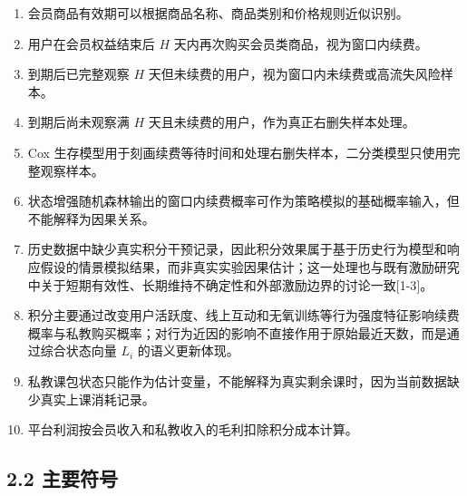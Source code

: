 \documentclass[
  12pt,
]{ctexart}
\providecommand{\tightlist}{%
  \setlength{\itemsep}{0pt}\setlength{\parskip}{0pt}}
\begin{document}
\begin{enumerate}
\def\labelenumi{\arabic{enumi}.}
\tightlist
\item
  会员商品有效期可以根据商品名称、商品类别和价格规则近似识别。
\item
  用户在会员权益结束后 \(H\) 天内再次购买会员类商品，视为窗口内续费。
\item
  到期后已完整观察 \(H\) 天但未续费的用户，视为窗口内未续费或高流失风险样本。
\item
  到期后尚未观察满 \(H\) 天且未续费的用户，作为真正右删失样本处理。
\item
  Cox 生存模型用于刻画续费等待时间和处理右删失样本，二分类模型只使用完整观察样本。
\item
  状态增强随机森林输出的窗口内续费概率可作为策略模拟的基础概率输入，但不能解释为因果关系。
\item
  历史数据中缺少真实积分干预记录，因此积分效果属于基于历史行为模型和响应假设的情景模拟结果，而非真实实验因果估计；这一处理也与既有激励研究中关于短期有效性、长期维持不确定性和外部激励边界的讨论一致{[}1-3{]}。
\item
  积分主要通过改变用户活跃度、线上互动和无氧训练等行为强度特征影响续费概率与私教购买概率；对行为近因的影响不直接作用于原始最近天数，而是通过综合状态向量 \(L_i\) 的语义更新体现。
\item
  私教课包状态只能作为估计变量，不能解释为真实剩余课时，因为当前数据缺少真实上课消耗记录。
\item
  平台利润按会员收入和私教收入的毛利扣除积分成本计算。
\end{enumerate}

\hypertarget{ux4e3bux8981ux7b26ux53f7}{%
\subsection{2.2 主要符号}\label{ux4e3bux8981ux7b26ux53f7}}
\end{document}
